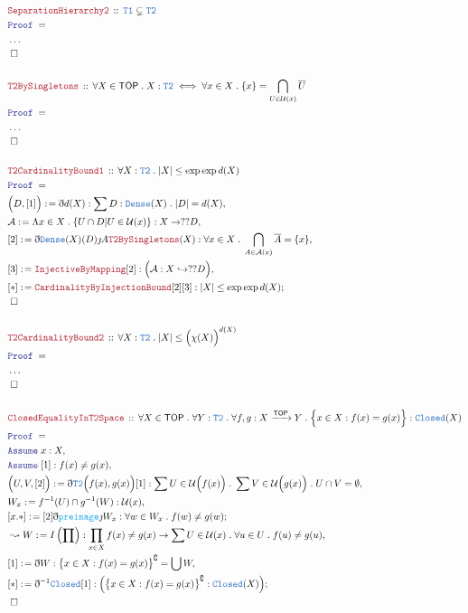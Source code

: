 \documentclass[12pt]{scrartcl}
\newcommand{\TYPE}[1]{\textcolor{NavyBlue}{\mathtt{#1}}}
\newcommand{\FUNC}[1]{\textcolor{Cerulean}{\mathtt{#1}}}
\newcommand{\LOGIC}[1]{\textcolor{Blue}{\mathtt{#1}}}
\newcommand{\THM}[1]{\textcolor{Maroon}{\mathtt{#1}}}
\renewcommand{\.}{\; . \;}
\newcommand{\de}{: \kern 0.1pc =}
\newcommand{\Act}[1]{\left( #1 \right)}
\newcommand{\Theorem}[2]{& \THM{#1} \, :: \, #2 \\ & \Proof = \\ }
\newcommand{\Page}[1]{ \begin{align*} #1 \end{align*}   }
\newcommand{ \bd }{ \ByDef }
\newcommand{\NoProof}{ & \ldots \\ \EndProof}
\newcommand{\ToInj}{\hookrightarrow}
\newcommand{\Arrow}{\xrightarrow}
\renewcommand{\c}{\complement}
\newcommand{\Say}[3]{& #1 \de #2 : #3, \\}
\newcommand{\Conclude}[3]{& #1 \de #2 : #3; \\}
\newcommand{\Derive}[3]{& \leadsto #1 \de #2 : #3, \\}
\newcommand{\Assume}[2]{& \LOGIC{Assume} \; #1 : #2, \\}
\newcommand{\QED}{\; \square}
\newcommand{\EndProof}{& \QED \\}
\newcommand{\ByDef}{\eth}
\newcommand{\ByConstr}{\jmath}
\newcommand{\Proof}{\LOGIC{Proof} \; }
\newcommand{\A}{\mathcal{A}}
\newcommand{\TOP}{\mathsf{TOP}}
\newcommand{\U}{\mathcal{U}}
\begin{document}
\Page{
	\Theorem{SeparationHierarchy2}
	{
		\TYPE{T1} \subsetneq \TYPE{T2}
	}
	\NoProof
	\\
	\Theorem{T2BySingletons}
	{
		\forall X \in \TOP \.
		X : \TYPE{T2} \iff 
		\forall x \in X \. 
		\{x\} = \bigcap_{U \in \U(x)} \overline{U}
	}
	\NoProof
	\\
	\Theorem{T2CardinalityBound1}
	{
		\forall X : \TYPE{T2} \.
		|X| \le \exp \exp d(X)
	}
	\Say{\Big(D,[1]\Big)}{\bd d(X)}{\sum D : \TYPE{Dense}(X) \. |D| = d(X)  }
	\Say{\A}{\Lambda x \in X \. \{ U \cap D | U \in \U(x)  \} }
	{
		X \to ??D
	}
	\Say{[2]}{\bd \TYPE{Dense}(X)(D)\ByConstr A \THM{T2BySingletons}(X)}
	{
		\forall x \in X \. \bigcap_{A \in \A(x)} \overline{A} = \{ x \}
	}
	\Say{[3]}{\THM{InjectiveByMapping}[2]}
	{
		\Big( \A : X \ToInj ??D \Big)
	}
	\Conclude{[*]}{\THM{CardinalityByInjectionBound}[2][3]}
	{
		|X| \le \exp \exp d(X)                              
	}
	\EndProof
	\\
	\Theorem{T2CardinalityBound2}
	{
		\forall X : \TYPE{T2} \.
		|X| \le \Big(\chi(X)\Big)^{d(X)}
	}
	\NoProof
	\\
	\Theorem{ClosedEqualityInT2Space}
	{
		\forall X \in \TOP \.
		\forall Y : \TYPE{T2} \.
		\forall f,g : X \Arrow{\TOP} Y \.
		\Big\{ x \in X : f(x) = g(x) \Big\} : \TYPE{Closed}(X)
	}
	\Assume{x}{X}
	\Assume{[1]}{f(x) \neq g(x)}
	\Say{\Big(U,V, [2]\Big)}{\bd \TYPE{T2}\Big( f(x),g(x)\Big)[1]}
	{
		\sum U \in \U\Big(f(x)\Big) \. 
		\sum V \in \U\Big(g(x)\Big) \. 
		U \cap V = \emptyset
	}
	\Say{W_x}{f^{-1}(U) \cap g^{-1}(W)}
	{
		\U(x)
	}
	\Conclude{[x.*]}{[2]\bd \FUNC{preimage}\ByConstr W_x}{\forall w \in W_x \. f(w) \neq g(w)} 
	\Derive{W}{I\Act{\prod}}
	{
		\prod_{x \in X} f(x) \neq g(x) \to \sum U \in \U(x) \. \forall u \in U \. f(u) \neq g(u) 
	}
	\Say{[1]}{\bd W}{  \big\{x \in X : f(x) = g(x) \big\}^\c = \bigcup W}
	\Conclude{[*]}{\bd^{-1} \TYPE{Closed}[1]}{ \Big( \big\{ x \in X : f(x) = g(x) \big\}^\c : \TYPE{Closed}(X)  \Big) }
	\EndProof
}
\end{document}
